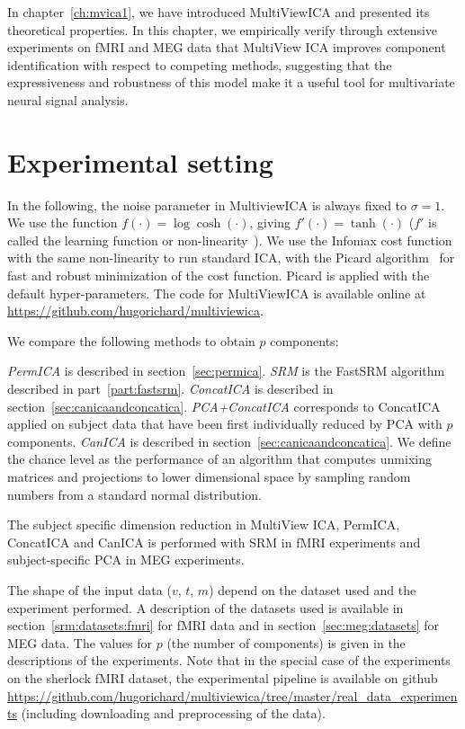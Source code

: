 In chapter~\ref{ch:mvica1}, we have introduced MultiViewICA and presented its
theoretical properties.
In this chapter, we empirically verify through extensive experiments on fMRI and
MEG data that MultiView ICA improves component identification with respect to competing methods, suggesting that the expressiveness and robustness of this model make it a useful tool for multivariate neural signal analysis.

\section{Experimental setting}
\label{sec:expts}
In the following, the noise parameter in MultiviewICA is always fixed to $\sigma =1$.
We use the function $f(\cdot)= \log\cosh(\cdot)$, giving $f'(\cdot) =
\tanh(\cdot)$ ($f'$ is called the learning function or non-linearity~\cite{hyvarinen1998independent}).
We use the Infomax cost function~\cite{bell1995information} with the same non-linearity to run standard ICA, with the Picard algorithm~\cite{ablin2018faster} for fast and robust minimization of the cost function. Picard is applied with the default hyper-parameters.
The code for MultiViewICA is available online at \url{https://github.com/hugorichard/multiviewica}.
%

We compare the following methods to obtain $p$ components:

\emph{PermICA} is described in section~\ref{sec:permica}.
%
\emph{SRM} is the FastSRM algorithm described in part~\ref{part:fastsrm}.
%
\emph{ConcatICA} is described in section~\ref{sec:canicaandconcatica}.
%
\emph{PCA+ConcatICA} corresponds to ConcatICA applied on subject data that have been first individually reduced by PCA with $p$ components. 
%
\emph{CanICA} is described in section~\ref{sec:canicaandconcatica}.
We define the chance level as the performance of an algorithm that computes unmixing matrices and projections to lower dimensional space by sampling random numbers from a standard normal distribution. 
% 

The subject specific dimension reduction in MultiView ICA, PermICA,
ConcatICA and CanICA is performed with SRM in
fMRI experiments and subject-specific PCA in MEG experiments.

The shape of the input data ($v$, $t$, $m$) depend on the dataset used and the experiment
  performed. A description of the datasets used is available in section~\ref{srm:datasets:fmri}
  for fMRI data and in section~\ref{sec:meg:datasets} for MEG data. The values for $p$ (the
  number of components) is given in the descriptions of the experiments. 
  Note that in the special case of the experiments on the sherlock fMRI dataset, the
  experimental pipeline is available on github \url{https://github.com/hugorichard/multiviewica/tree/master/real_data_experiments} (including downloading and
  preprocessing of the data).

